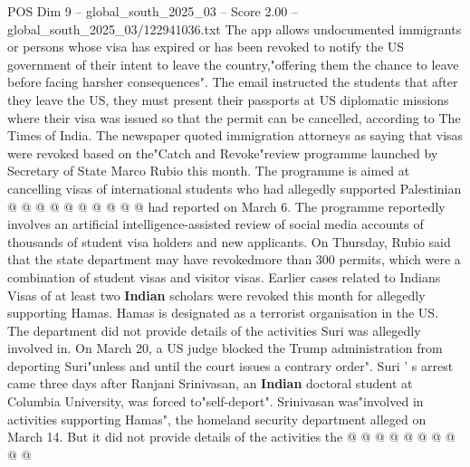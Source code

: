 \begin{textsample}{POS Dim 9 – global\_south\_2025\_03 – Score 2.00 – global\_south\_2025\_03/122941036.txt}
The app allows undocumented immigrants or persons whose visa has expired or has been revoked to notify the US government of their intent to leave the country,"offering them the chance to leave before facing harsher consequences".
The email instructed the students that after they leave the US, they must present their passports at US diplomatic missions where their visa was issued so that the permit can be cancelled, according to The Times of India.
The newspaper quoted immigration attorneys as saying that visas were revoked based on the"Catch and Revoke"review programme launched by Secretary of State Marco Rubio this month.
The programme is aimed at cancelling visas of international students who had allegedly supported Palestinian @ @ @ @ @ @ @ @ @ @ had reported on March 6.
The programme reportedly involves an artificial intelligence-assisted review of social media accounts of thousands of student visa holders and new applicants.
On Thursday, Rubio said that the state department may have revokedmore than 300 permits, which were a combination of student visas and visitor visas.
Earlier cases related to Indians Visas of at least two \textbf{Indian} scholars were revoked this month for allegedly supporting Hamas.
Hamas is designated as a terrorist organisation in the US.
The department did not provide details of the activities Suri was allegedly involved in.
On March 20, a US judge blocked the Trump administration from deporting Suri"unless and until the court issues a contrary order".
Suri ' s arrest came three days after Ranjani Srinivasan, an \textbf{Indian} doctoral student at Columbia University, was forced to"self-deport".
Srinivasan was"involved in activities supporting Hamas", the homeland security department alleged on March 14.
But it did not provide details of the activities the @ @ @ @ @ @ @ @ @ @

\end{textsample}
